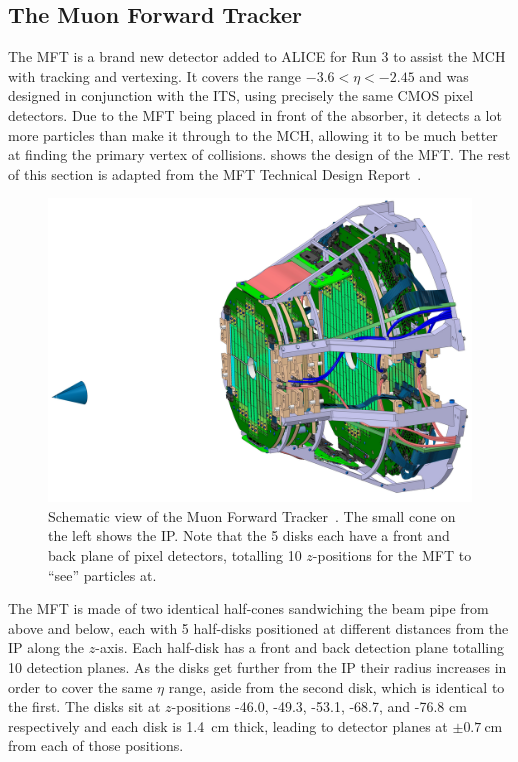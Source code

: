 \subsection{The Muon Forward Tracker}\label{sec:MFT_Theory}
The MFT is a brand new detector added to ALICE for Run 3 to assist the MCH with tracking and vertexing. It covers the range $-3.6<\eta<-2.45$ and was designed in conjunction with the ITS, using precisely the same CMOS pixel detectors. Due to the MFT being placed in front of the absorber, it detects a lot more particles than make it through to the MCH, allowing it to be much better at finding the primary vertex of collisions.  shows the design of the MFT. The rest of this section is adapted from the MFT Technical Design Report~\cite{MFT_TDR}. 

\begin{figure}[h]
    \begin{center}
        \includegraphics[width=.8\textwidth]{Figs/MFT_schematic.jpg}
        \caption{Schematic view of the Muon Forward Tracker~\cite{MFT_Schematic}. The small cone on the left shows the IP. Note that the 5 disks each have a front and back plane of pixel detectors, totalling 10 $z$-positions for the MFT to ``see'' particles at.}
        \label{fig:MFT Schematic}
    \end{center}
\end{figure}

The MFT is made of two identical half-cones sandwiching the beam pipe from above and below, each with 5 half-disks positioned at different distances from the IP along the $z$-axis. Each half-disk has a front and back detection plane totalling 10 detection planes. As the disks get further from the IP their radius increases in order to cover the same $\eta$ range, aside from the second disk, which is identical to the first. The disks sit at $z$-positions -46.0, -49.3, -53.1, -68.7, and -76.8 \si{\centi\metre} respectively and each disk is \SI{1.4}{\centi\metre} thick, leading to detector planes at $\pm \SI{0.7}{\centi\metre}$ from each of those positions.

